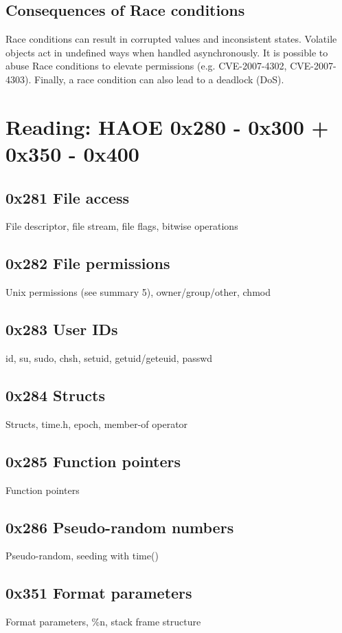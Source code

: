 \documentclass[letterpaper]{article}
\begin{document}
\subsection{Consequences of Race conditions}
Race conditions can result in corrupted values and inconsistent states. Volatile objects act in undefined ways when handled asynchronously. It is possible to abuse Race conditions to elevate permissions (e.g. CVE-2007-4302, CVE-2007-4303). Finally, a race condition can also lead to a deadlock (DoS).

\section{Reading: HAOE 0x280 - 0x300 + 0x350 - 0x400}
\subsection*{0x281 File access}
File descriptor, file stream, file flags, bitwise operations

\subsection*{0x282 File permissions}
Unix permissions (see summary 5), owner/group/other, chmod

\subsection*{0x283 User IDs}
id, su, sudo, chsh, setuid, getuid/geteuid, passwd

\subsection*{0x284 Structs}
Structs, time.h, epoch, member-of operator

\subsection*{0x285 Function pointers}
Function pointers

\subsection*{0x286 Pseudo-random numbers}
Pseudo-random, seeding with time()

\subsection*{0x351 Format parameters}
Format parameters, \%n, stack frame structure
\end{document}
